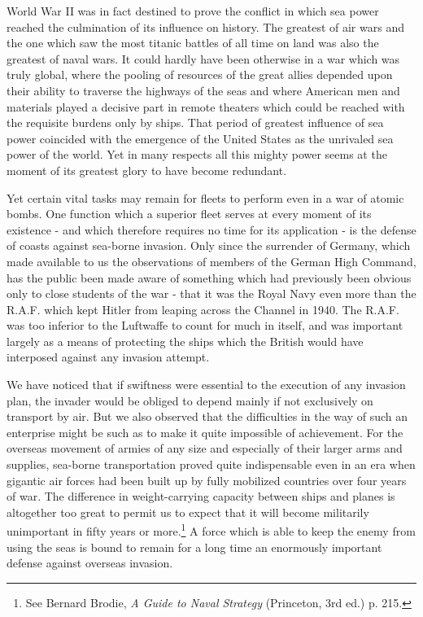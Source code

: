 World War II was in fact destined to prove the conflict in which sea power reached the culmination of its influence on history. The greatest of air wars and the one which saw the most titanic battles of all time on land was also the greatest of naval wars. It could hardly have been otherwise in a war which was truly global, where the pooling of resources of the great allies depended upon their ability to traverse the highways of the seas and where American men and materials played a decisive part in remote theaters which could be reached with the requisite burdens only by ships. That period of greatest influence of sea power coincided with the emergence of the United States as the unrivaled sea power of the world. Yet in many respects all this mighty power seems at the moment of its greatest glory to have become redundant.

Yet certain vital tasks may remain for fleets to perform even in a war of atomic bombs. One function which a superior fleet serves at every moment of its existence - and which therefore requires no time for its application - is the defense of coasts against sea-borne invasion. Only since the surrender of Germany, which made available to us the observations of members of the German High Command, has the public been made aware of something which had previously been obvious only to close students of the war - that it was the Royal Navy even more than the R.A.F. which kept Hitler from leaping across the Channel in 1940. The R.A.F. was too inferior to the Luftwaffe to count for much in itself, and was important largely as a means of protecting the ships which the British would have interposed against any invasion attempt.

We have noticed that if swiftness were essential to the execution of any invasion plan, the invader would be obliged to depend mainly if not exclusively on transport by air. But we also observed that the difficulties in the way of such an enterprise might be such as to make it quite impossible of achievement. For the overseas movement of armies of any size and especially of their larger arms and supplies, sea-borne transportation proved quite indispensable even in an era when gigantic air forces had been built up by fully mobilized countries over four years of war. The difference in weight-carrying capacity between ships and planes is altogether too great to permit us to expect that it will become militarily unimportant in fifty years or more.\footnote{See Bernard Brodie, \textit{A Guide to Naval Strategy} (Princeton, 3rd ed.) p. 215.} A force which is able to keep the enemy from using the seas is bound to remain for a long time an enormously important defense against overseas invasion.

